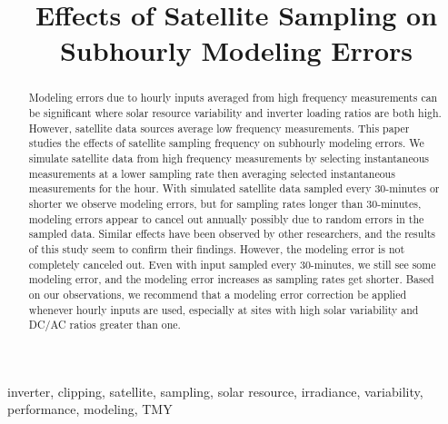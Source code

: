 \documentclass[conference]{IEEEtran}
\begin{document}
\title{Effects of Satellite Sampling on Subhourly Modeling Errors}

\author{
}

\maketitle

\begin{abstract}
Modeling errors due to hourly inputs averaged from high frequency measurements can be significant where solar resource variability and inverter loading ratios are both high. However, satellite data sources average low frequency measurements. This paper studies the effects of satellite sampling frequency on subhourly modeling errors. We simulate satellite data from high frequency measurements by selecting instantaneous measurements at a lower sampling rate then averaging selected instantaneous measurements for the hour. With simulated satellite data sampled every 30-minutes or shorter we observe modeling errors, but for sampling rates longer than 30-minutes, modeling errors appear to cancel out annually possibly due to random errors in the sampled data. Similar effects have been observed by other researchers, and the results of this study seem to confirm their findings. However, the modeling error is not completely canceled out. Even with input sampled every 30-minutes, we still see some modeling error, and the modeling error increases as sampling rates get shorter. Based on our observations, we recommend that a modeling error correction be applied whenever hourly inputs are used, especially at sites with high solar variability and DC/AC ratios greater than one.
\end{abstract}

\begin{IEEEkeywords}
inverter, clipping, satellite, sampling, solar resource, irradiance, variability, performance, modeling, TMY
\end{IEEEkeywords}
\end{document}

